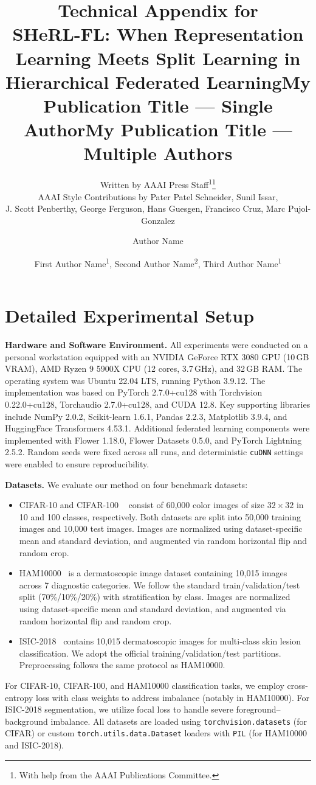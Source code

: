 \documentclass[letterpaper]{article} %
\title{Technical Appendix for\\ SHeRL-FL: When Representation Learning Meets Split Learning in Hierarchical Federated Learning}
\author{
    Written by AAAI Press Staff\textsuperscript{\rm 1}\thanks{With help from the AAAI Publications Committee.}\\
    AAAI Style Contributions by Pater Patel Schneider,
    Sunil Issar,\\
    J. Scott Penberthy,
    George Ferguson,
    Hans Guesgen,
    Francisco Cruz\equalcontrib,
    Marc Pujol-Gonzalez\equalcontrib
}
\title{My Publication Title --- Single Author}
\author {
    Author Name
}
\title{My Publication Title --- Multiple Authors}
\author {
    First Author Name\textsuperscript{\rm 1},
    Second Author Name\textsuperscript{\rm 2},
    Third Author Name\textsuperscript{\rm 1}
}
\begin{document}
\maketitle

\section{Detailed Experimental Setup}
    \textbf{Hardware and Software Environment.} All experiments were conducted on a personal workstation equipped with an NVIDIA GeForce RTX 3080 GPU (10\,GB VRAM), AMD Ryzen 9 5900X CPU (12 cores, 3.7\,GHz), and 32\,GB RAM. The operating system was Ubuntu 22.04 LTS, running Python 3.9.12. The implementation was based on PyTorch 2.7.0+cu128 with Torchvision 0.22.0+cu128, Torchaudio 2.7.0+cu128, and CUDA 12.8. Key supporting libraries include NumPy 2.0.2, Scikit-learn 1.6.1, Pandas 2.2.3, Matplotlib 3.9.4, and HuggingFace Transformers 4.53.1. Additional federated learning components were implemented with Flower 1.18.0, Flower Datasets 0.5.0, and PyTorch Lightning 2.5.2. Random seeds were fixed across all runs, and deterministic \texttt{cuDNN} settings were enabled to ensure reproducibility.

    \noindent\textbf{Datasets.} We evaluate our method on four benchmark datasets:
        \begin{itemize}
            \item CIFAR-10 and CIFAR-100 ~\cite{krizhevsky2009learning} consist of 60,000 color images of size $32 \times 32$ in 10 and 100 classes, respectively. Both datasets are split into 50,000 training images and 10,000 test images. Images are normalized using dataset-specific mean and standard deviation, and augmented via random horizontal flip and random crop.
            \item HAM10000~\cite{tschandl2018ham10000} is a dermatoscopic image dataset containing 10,015 images across 7 diagnostic categories. We follow the standard train/validation/test split (70\%/10\%/20\%) with stratification by class. Images are normalized using dataset-specific mean and standard deviation, and augmented via random horizontal flip and random crop.
            \item ISIC-2018~\cite{8363547} contains 10,015 dermatoscopic images for multi-class skin lesion classification. We adopt the official training/validation/test partitions. Preprocessing follows the same protocol as HAM10000.
        \end{itemize}
        For CIFAR-10, CIFAR-100, and HAM10000 classification tasks, we employ cross-entropy loss with class weights to address imbalance (notably in HAM10000). For ISIC-2018 segmentation, we utilize focal loss to handle severe foreground–background imbalance. All datasets are loaded using \texttt{torchvision.datasets} (for CIFAR) or custom \texttt{torch.utils.data.Dataset} loaders with \texttt{PIL} (for HAM10000 and ISIC-2018).
    
\end{document}
